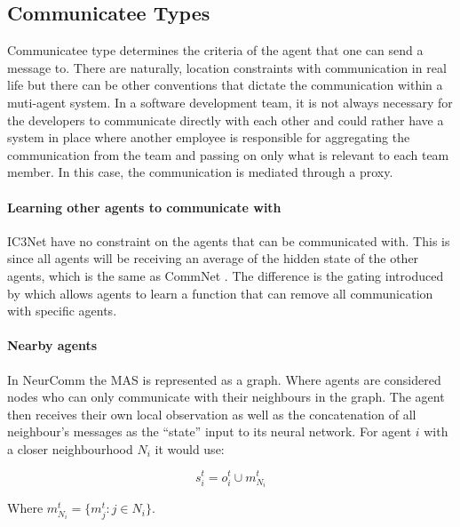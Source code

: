 \documentclass{article}
\begin{document}
\subsection{Communicatee Types}

Communicatee type determines the criteria of the agent that one can send a message to. There are naturally, location constraints with communication in real life but there can be other conventions that dictate the communication within a muti-agent system. In a software development team, it is not always necessary for the developers to communicate directly with each other and could rather have a system in place where another employee is responsible for aggregating the communication from the team and passing on only what is relevant to each team member. In this case, the communication is mediated through a proxy.

\paragraph{Learning other agents to communicate with} IC3Net \citep{singh2018ic3net} have no constraint on the agents that can be communicated with. This is since all agents will be receiving an average of the hidden state of the other agents, which is the same as CommNet \citep{sukhbaatar2016commnet}. The difference is the gating introduced by \citet{singh2018ic3net} which allows agents to learn a function that can remove all communication with specific agents. 

\paragraph{Nearby agents} In NeurComm \citep{chu2020NeurComm} the MAS is represented as a graph. Where agents are considered nodes who can only communicate with their neighbours in the graph. The agent then receives their own local observation as well as the concatenation of all neighbour's messages as the ``state'' input to its neural network. For agent $i$ with a closer neighbourhood $N_i$ it would use:

\begin{equation}
	s_i^t = o_i^t \cup m_{N_i}^t 
\end{equation}

Where $m_{N_i}^t = \{ m_j^t : j \in N_i \}$.
\end{document}
